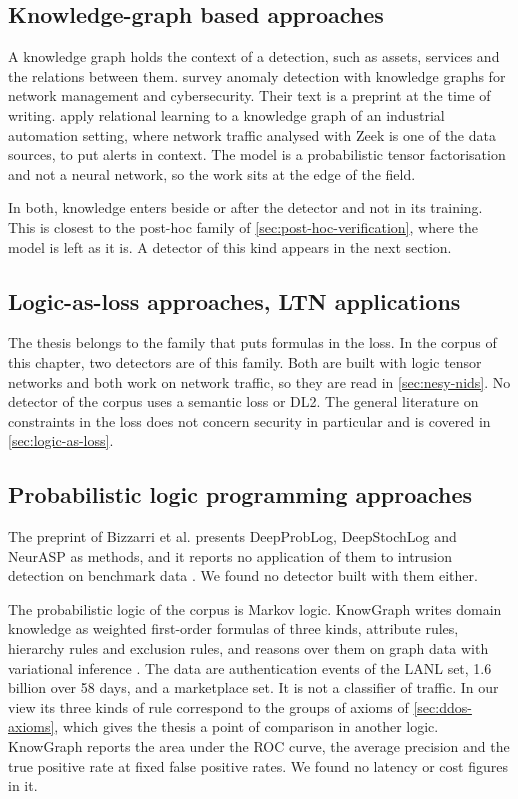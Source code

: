 \subsection{Knowledge-graph based approaches}
\label{sec:nesy-kg}

A knowledge graph holds the context of a detection, such as assets, services and
the relations between them. \citet{tailhardat2025anomaly} survey anomaly
detection with knowledge graphs for network management and cybersecurity. Their
text is a preprint at the time of writing.
\citet{garrido2021knowledge} apply relational learning to a knowledge graph of
an industrial automation setting, where network traffic analysed with Zeek is
one of the data sources, to put alerts in context. The model is a probabilistic
tensor factorisation and not a neural network, so the work sits at the edge of
the field.

In both, knowledge enters beside or after the detector and not in its training.
This is closest to the post-hoc family of \cref{sec:post-hoc-verification}, where
the model is left as it is. A detector of this kind appears in the next section.

\subsection{Logic-as-loss approaches, LTN applications}
\label{sec:nesy-logic-loss}

The thesis belongs to the family that puts formulas in the loss. In the corpus
of this chapter, two detectors are of this family. Both are built with logic
tensor networks and both work on network traffic, so they are read in
\cref{sec:nesy-nids}. No detector of the corpus uses a semantic loss or DL2. The
general literature on constraints in the loss does not concern security in
particular and is covered in \cref{sec:logic-as-loss}.

\subsection{Probabilistic logic programming approaches}
\label{sec:nesy-plp}

The preprint of Bizzarri et al. presents DeepProbLog, DeepStochLog and NeurASP
as methods, and it reports no application of them to intrusion detection on
benchmark data \citep{bizzarri2024synergistic}. We found no detector built with
them either.

The probabilistic logic of the corpus is Markov logic. KnowGraph writes domain
knowledge as weighted first-order formulas of three kinds, attribute rules,
hierarchy rules and exclusion rules, and reasons over them on graph data with
variational inference \citep{zhou2024knowgraph}. The data are authentication
events of the LANL set, 1.6 billion over 58 days, and a marketplace set. It is
not a classifier of traffic. In our view its three kinds of rule correspond to
the groups of axioms of \cref{sec:ddos-axioms}, which gives the thesis a point
of comparison in another logic. KnowGraph reports the area under the ROC curve, the average
precision and the true positive rate at fixed false positive rates. We found no
latency or cost figures in it.

